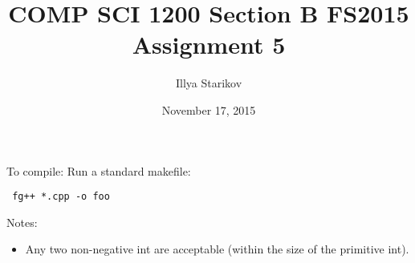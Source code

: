 \documentclass{article}
\begin{document}
\title{COMP SCI 1200 Section B FS2015 Assignment 5}
\date{November 17, 2015}
\author{Illya Starikov}

\maketitle

\noindent
To compile: Run a standard makefile: \begin{verbatim} fg++ *.cpp -o foo \end{verbatim}

\noindent
Notes:
\begin{itemize}
\item Any two non-negative int are acceptable (within the size of the primitive int).
\end{itemize}
\end{document}
